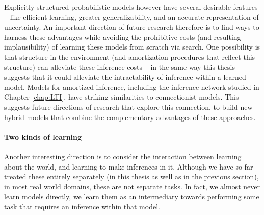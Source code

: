 Explicitly structured probabilistic models however have several desirable features -- like efficient learning\citep{kemp2007learning}, greater generalizability\citep{lake2017building}, and an accurate representation of uncertainty\citep{hacking2006emergence}. An important direction of future research therefore is to find ways to harness these advantages while avoiding the prohibitive costs (and resulting implausibility) of learning these models from scratch via search. One possibility is that structure in the environment (and amortization procedures that reflect this structure) can alleviate these inference costs -- in the same way this thesis suggests that it could alleviate the intractability of inference within a learned model. Models for amortized inference, including the inference network studied in Chapter \ref{chap:LTI}, have striking similarities to connectionist models. This suggests future directions of research that explore this connection, to build new hybrid models that combine the complementary advantages of these approaches.


\paragraph{Two kinds of learning}

Another interesting direction is to consider the interaction between learning about the world, and learning to make inferences in it. Although we have so far treated these entirely separately (in this thesis as well as in the previous section), in most real world domains, these are not separate tasks. In fact, we almost never learn models directly, we learn them as an intermediary towards performing some task that requires an inference within that model. 


